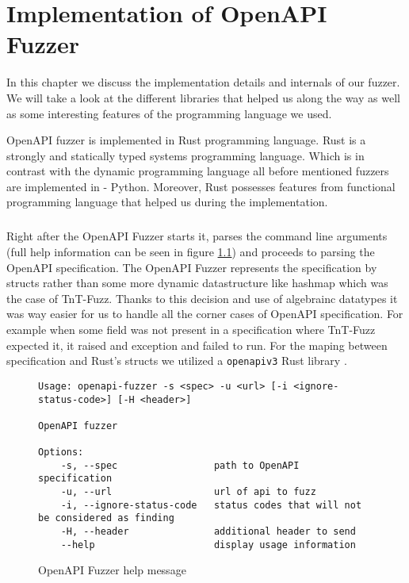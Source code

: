 \chapter{Implementation of OpenAPI Fuzzer}
In this chapter we discuss the implementation details and internals of our fuzzer. We will take a look at the different libraries that helped us along the way as well as some interesting features of the programming language we used.

OpenAPI fuzzer is implemented in Rust programming language. Rust is a strongly and statically typed systems programming language. Which is in contrast with the dynamic programming language all before mentioned fuzzers are implemented in - Python. Moreover, Rust possesses features from functional programming language that helped us during the implementation.

\paragraph{}
Right after the OpenAPI Fuzzer starts it, parses the command line arguments (full help information can be seen in figure \ref{fig:openapi-fuzzer-help}) and proceeds to parsing the OpenAPI specification. The OpenAPI Fuzzer represents the specification by structs rather than some more dynamic datastructure like hashmap which was the case of TnT-Fuzz. Thanks to this decision and use of algebrainc datatypes it was way easier for us to handle all the corner cases of OpenAPI specification. For example when some field was not present in a specification where TnT-Fuzz expected it, it raised and exception and failed to run. For the maping between specification and Rust's structs we utilized a \texttt{openapiv3} Rust library \cite{openapiv32020github}.

\begin{figure}
\begin{verbatim}
Usage: openapi-fuzzer -s <spec> -u <url> [-i <ignore-status-code>] [-H <header>]

OpenAPI fuzzer

Options:
    -s, --spec                 path to OpenAPI specification
    -u, --url                  url of api to fuzz
    -i, --ignore-status-code   status codes that will not be considered as finding
    -H, --header               additional header to send
    --help                     display usage information
\end{verbatim}
\caption{OpenAPI Fuzzer help message}
\label{fig:openapi-fuzzer-help}
\end{figure}

